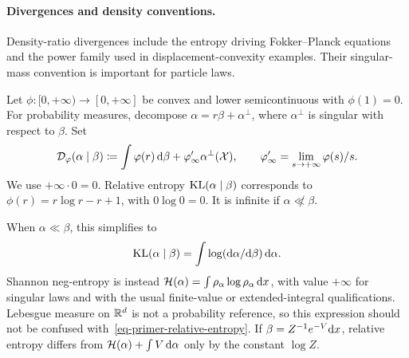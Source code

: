 \paragraph{Divergences and density conventions.}
Density-ratio divergences include the entropy driving Fokker--Planck equations and the power family used in displacement-convexity examples. Their singular-mass convention is important for particle laws.
\begin{defn}\label{def_divergence}\label{def-measure-relative-entropy}
Let $\phi:[0,+\infty)\to[0,+\infty]$ be convex and lower semicontinuous with $\phi(1)=0$. For probability measures, decompose $\alpha=r\beta+\alpha^\perp$, where $\alpha^\perp$ is singular with respect to $\beta$. Set
\begin{equation}\label{eq-phi-div}
  \mathcal{D}_\varphi(\alpha\mid\beta)
  \coloneqq\int\varphi(r)\,\mathrm{d}\beta+\varphi'_\infty\alpha^\perp(\mathcal{X}),
  \qquad \varphi'_\infty=\lim_{s\to+\infty}\varphi(s)/s.
\end{equation}
We use $+\infty\cdot0=0$. Relative entropy $\operatorname{KL}(\alpha\mid\beta)$ corresponds to $\phi(r)=r\log r-r+1$, with $0\log0=0$. It is infinite if $\alpha\not\ll\beta$.
\end{defn}
When $\alpha\ll\beta$, this simplifies to
\begin{equation}\label{eq-primer-relative-entropy}
  \operatorname{KL}(\alpha\mid\beta)=\int\log(\mathrm{d}\alpha/\mathrm{d}\beta)\,\mathrm{d}\alpha.
\end{equation}
Shannon neg-entropy is instead $\mathcal H(\alpha)=\int\rho_\alpha\log\rho_\alpha\,\mathrm{d} x$, with value $+\infty$ for singular laws and with the usual finite-value or extended-integral qualifications. Lebesgue measure on $\mathbb{R}^d$ is not a probability reference, so this expression should not be confused with~\eqref{eq-primer-relative-entropy}. If $\beta=Z^{-1}e^{-V}\mathrm{d} x$, relative entropy differs from $\mathcal H(\alpha)+\int V\,\mathrm{d}\alpha$ only by the constant $\log Z$.

